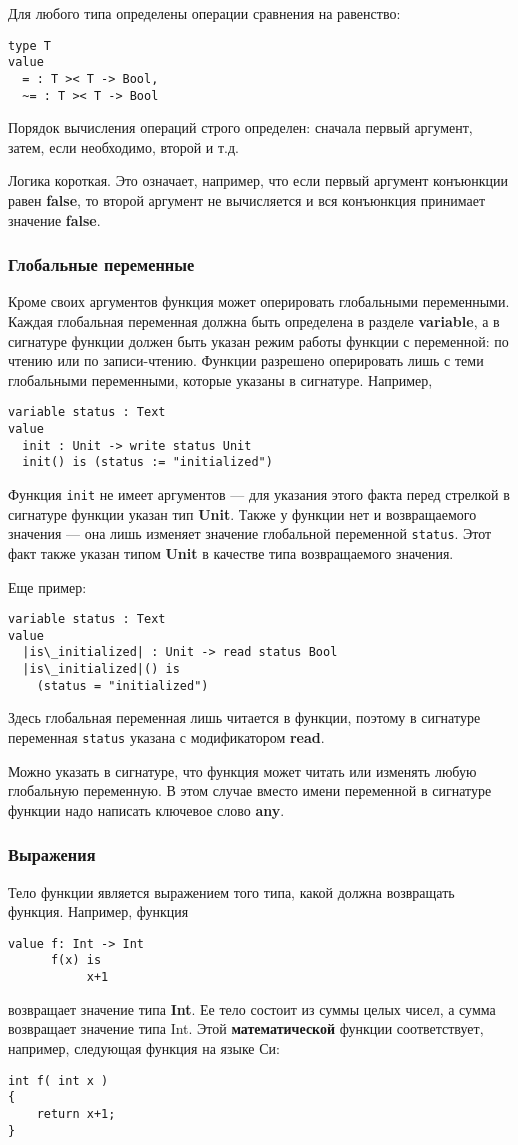 \documentclass[14pt, twoside]{extreport}
\newcommand{\head}[1]{\vspace{1cm}\subsubsection*{#1}}
\begin{document}
Для любого типа определены операции сравнения на равенство:
\begin{lstlisting}
type T
value
  = : T >< T -> Bool,
  ~= : T >< T -> Bool
\end{lstlisting}

Порядок вычисления операций строго определен: сначала первый аргумент, затем, если необходимо, второй и т.д.

Логика короткая. Это означает, например, что если первый аргумент конъюнкции равен \textbf{false}, то второй аргумент не вычисляется и вся конъюнкция принимает значение \textbf{false}.

\head{Глобальные переменные}
Кроме своих аргументов функция может оперировать глобальными переменными. Каждая глобальная переменная должна быть определена в разделе \textbf{variable}, а в сигнатуре функции должен быть указан режим работы функции с переменной: по чтению или по записи-чтению. Функции разрешено оперировать лишь с теми глобальными переменными, которые указаны в сигнатуре. Например,
\begin{lstlisting}
variable status : Text
value
  init : Unit -> write status Unit
  init() is (status := "initialized")	
\end{lstlisting}

Функция \texttt{init} не имеет аргументов --- для указания этого факта перед стрелкой в сигнатуре функции указан тип \textbf{Unit}. Также у функции нет и возвращаемого значения --- она лишь изменяет значение глобальной переменной \texttt{status}. Этот факт также указан типом \textbf{Unit} в качестве типа возвращаемого значения.

Еще пример:
\begin{lstlisting}[escapechar={|}]
variable status : Text
value
  |is\_initialized| : Unit -> read status Bool
  |is\_initialized|() is
	(status = "initialized")	
\end{lstlisting}

Здесь глобальная переменная лишь читается в функции, поэтому в сигнатуре переменная \texttt{status} указана с модификатором \textbf{read}.

Можно указать в сигнатуре, что функция может читать или изменять любую глобальную переменную. В этом случае вместо имени переменной в сигнатуре функции надо написать ключевое слово \textbf{any}.

\head{Выражения}
Тело функции является выражением того типа, какой должна возвращать функция. Например, функция
\begin{lstlisting}
value f: Int -> Int
      f(x) is
	       x+1
\end{lstlisting}
возвращает значение типа \textbf{Int}. Ее тело состоит из суммы целых чисел, а сумма возвращает значение типа Int. Этой \textbf{математической} функции соответствует, например, следующая функция на языке Си:
\begin{lstlisting}
int f( int x )
{
    return x+1;
}
\end{lstlisting}
\end{document}

